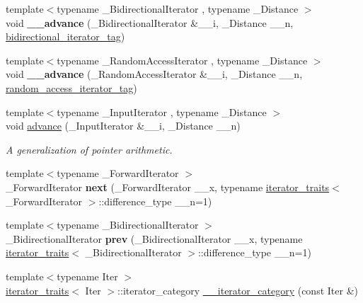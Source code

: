 \begin{DoxyCompactItemize}
\item 
{\footnotesize template$<$typename \+\_\+\+Bidirectional\+Iterator , typename \+\_\+\+Distance $>$ }\\void {\bfseries \+\_\+\+\_\+advance} (\+\_\+\+Bidirectional\+Iterator \&\+\_\+\+\_\+i, \+\_\+\+Distance \+\_\+\+\_\+n, \hyperlink{structstd_1_1bidirectional__iterator__tag}{bidirectional\+\_\+iterator\+\_\+tag})\hypertarget{namespacestd_aa88626836fb848c16f7c10c664166243}{}\label{namespacestd_aa88626836fb848c16f7c10c664166243}

\item 
{\footnotesize template$<$typename \+\_\+\+Random\+Access\+Iterator , typename \+\_\+\+Distance $>$ }\\void {\bfseries \+\_\+\+\_\+advance} (\+\_\+\+Random\+Access\+Iterator \&\+\_\+\+\_\+i, \+\_\+\+Distance \+\_\+\+\_\+n, \hyperlink{structstd_1_1random__access__iterator__tag}{random\+\_\+access\+\_\+iterator\+\_\+tag})\hypertarget{namespacestd_afdb6e1a8e68f7a8d8dfae9522b3e71ce}{}\label{namespacestd_afdb6e1a8e68f7a8d8dfae9522b3e71ce}

\item 
{\footnotesize template$<$typename \+\_\+\+Input\+Iterator , typename \+\_\+\+Distance $>$ }\\void \hyperlink{namespacestd_a2d43d8e656c1d71e14e398cdd726af37}{advance} (\+\_\+\+Input\+Iterator \&\+\_\+\+\_\+i, \+\_\+\+Distance \+\_\+\+\_\+n)
\begin{DoxyCompactList}\small\item\em A generalization of pointer arithmetic. \end{DoxyCompactList}\item 
{\footnotesize template$<$typename \+\_\+\+Forward\+Iterator $>$ }\\\+\_\+\+Forward\+Iterator {\bfseries next} (\+\_\+\+Forward\+Iterator \+\_\+\+\_\+x, typename \hyperlink{structstd_1_1iterator__traits}{iterator\+\_\+traits}$<$ \+\_\+\+Forward\+Iterator $>$\+::difference\+\_\+type \+\_\+\+\_\+n=1)\hypertarget{namespacestd_ab49259d704618e731dc3c6ddcddf7080}{}\label{namespacestd_ab49259d704618e731dc3c6ddcddf7080}

\item 
{\footnotesize template$<$typename \+\_\+\+Bidirectional\+Iterator $>$ }\\\+\_\+\+Bidirectional\+Iterator {\bfseries prev} (\+\_\+\+Bidirectional\+Iterator \+\_\+\+\_\+x, typename \hyperlink{structstd_1_1iterator__traits}{iterator\+\_\+traits}$<$ \+\_\+\+Bidirectional\+Iterator $>$\+::difference\+\_\+type \+\_\+\+\_\+n=1)\hypertarget{namespacestd_a33a6bb27ffe6455202910e6c66963434}{}\label{namespacestd_a33a6bb27ffe6455202910e6c66963434}

\item 
{\footnotesize template$<$typename Iter $>$ }\\\hyperlink{structstd_1_1iterator__traits}{iterator\+\_\+traits}$<$ Iter $>$\+::iterator\+\_\+category \hyperlink{namespacestd_af7742b4d3ca0fbe92c46ba0c1fb3da37}{\+\_\+\+\_\+iterator\+\_\+category} (const Iter \&)
\end{DoxyCompactItemize}


